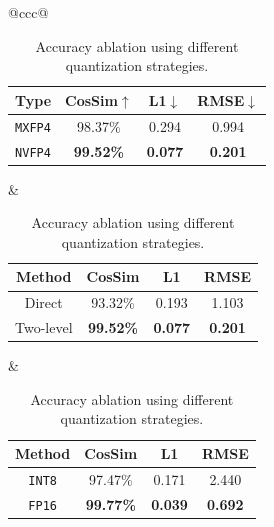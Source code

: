 \begin{table}[H]
\vspace{-.5em}
\footnotesize
\centering
\caption{Accuracy ablation using different quantization strategies.} %
\label{tab:acc_ablation}
\begin{minipage}{\linewidth} %
\centering
\begin{tabular}{@{}ccc@{}}
\begin{minipage}{0.3\linewidth}
\centering
\setlength{\tabcolsep}{3pt}
\label{table:a}
\begin{tabular}{@{}cccc@{}}
\toprule
\textbf{Type} & \textbf{CosSim}$\uparrow$ & \textbf{L1}$\downarrow$ & \textbf{RMSE}$\downarrow$ \\
\midrule
\texttt{MXFP4} & 98.37\% & 0.294 & 0.994 \\
\texttt{NVFP4} & \textbf{99.52\%} & \textbf{0.077} & \textbf{0.201} \\
\bottomrule
\end{tabular}
\end{minipage}
&
\begin{minipage}{0.31\linewidth}
\centering
\setlength{\tabcolsep}{3pt}
\label{table:b}
\begin{tabular}{@{}cccc@{}}
\toprule
\textbf{Method} & \textbf{CosSim} & \textbf{L1} & \textbf{RMSE} \\
\midrule
Direct          & 93.32\% & 0.193 & 1.103 \\
Two-level   & \textbf{99.52\%} & \textbf{0.077} & \textbf{0.201} \\
\bottomrule
\end{tabular}
\end{minipage}
&
\begin{minipage}{0.31\linewidth}
\centering
\setlength{\tabcolsep}{3pt}
\label{table:c}
\begin{tabular}{@{}cccc@{}}
\toprule
\textbf{Method} & \textbf{CosSim} & \textbf{L1} & \textbf{RMSE} \\
\midrule
\texttt{INT8}  & 97.47\% & 0.171 & 2.440 \\
\texttt{FP16}  & \textbf{99.77\%} & \textbf{0.039} & \textbf{0.692} \\
\bottomrule
\end{tabular}
\end{minipage}
\end{tabular}
\end{minipage}
\vspace{-.5em}
\end{table}



